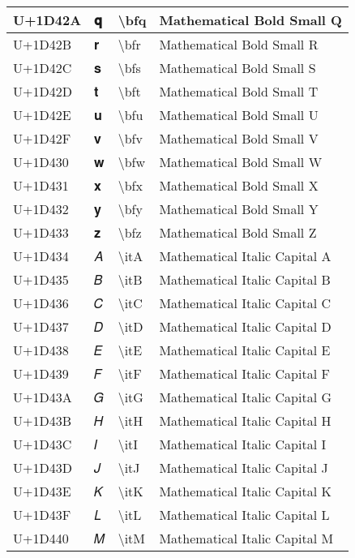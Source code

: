 \begin{table}[h]
\begin{tabulary}{\linewidth}{|L|L|L|L|}
\hline
U+1D42A & 𝐪 & {\textbackslash}bfq & Mathematical Bold Small Q \\
\hline
U+1D42B & 𝐫 & {\textbackslash}bfr & Mathematical Bold Small R \\
\hline
U+1D42C & 𝐬 & {\textbackslash}bfs & Mathematical Bold Small S \\
\hline
U+1D42D & 𝐭 & {\textbackslash}bft & Mathematical Bold Small T \\
\hline
U+1D42E & 𝐮 & {\textbackslash}bfu & Mathematical Bold Small U \\
\hline
U+1D42F & 𝐯 & {\textbackslash}bfv & Mathematical Bold Small V \\
\hline
U+1D430 & 𝐰 & {\textbackslash}bfw & Mathematical Bold Small W \\
\hline
U+1D431 & 𝐱 & {\textbackslash}bfx & Mathematical Bold Small X \\
\hline
U+1D432 & 𝐲 & {\textbackslash}bfy & Mathematical Bold Small Y \\
\hline
U+1D433 & 𝐳 & {\textbackslash}bfz & Mathematical Bold Small Z \\
\hline
U+1D434 & 𝐴 & {\textbackslash}itA & Mathematical Italic Capital A \\
\hline
U+1D435 & 𝐵 & {\textbackslash}itB & Mathematical Italic Capital B \\
\hline
U+1D436 & 𝐶 & {\textbackslash}itC & Mathematical Italic Capital C \\
\hline
U+1D437 & 𝐷 & {\textbackslash}itD & Mathematical Italic Capital D \\
\hline
U+1D438 & 𝐸 & {\textbackslash}itE & Mathematical Italic Capital E \\
\hline
U+1D439 & 𝐹 & {\textbackslash}itF & Mathematical Italic Capital F \\
\hline
U+1D43A & 𝐺 & {\textbackslash}itG & Mathematical Italic Capital G \\
\hline
U+1D43B & 𝐻 & {\textbackslash}itH & Mathematical Italic Capital H \\
\hline
U+1D43C & 𝐼 & {\textbackslash}itI & Mathematical Italic Capital I \\
\hline
U+1D43D & 𝐽 & {\textbackslash}itJ & Mathematical Italic Capital J \\
\hline
U+1D43E & 𝐾 & {\textbackslash}itK & Mathematical Italic Capital K \\
\hline
U+1D43F & 𝐿 & {\textbackslash}itL & Mathematical Italic Capital L \\
\hline
U+1D440 & 𝑀 & {\textbackslash}itM & Mathematical Italic Capital M \\

\end{tabulary}
\end{table}
